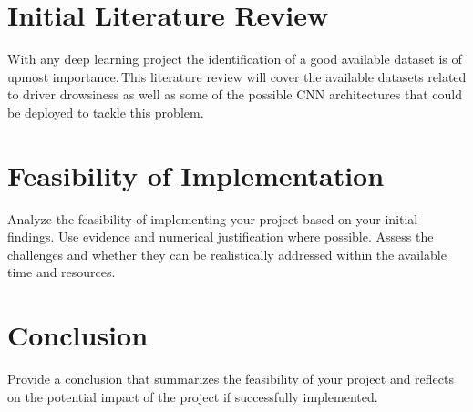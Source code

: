 \documentclass[a4paper, 11pt, twocolumn]{article}
\begin{document}
\section{Initial Literature Review}
\label{sec:litreview}
With any deep learning project the identification of a good available dataset is of upmost importance.\,This literature review will cover the available datasets related to driver
drowsiness as well as some of the possible CNN architectures that could be deployed to tackle this problem.\,








\section{Feasibility of Implementation}
\label{sec:feasibility}
Analyze the feasibility of implementing your project based on your initial findings. Use evidence and numerical justification where possible. Assess the challenges and whether they can be realistically addressed within the available time and resources.

\section{Conclusion}
\label{sec:conclusion}
Provide a conclusion that summarizes the feasibility of your project and reflects on the potential impact of the project if successfully implemented.

\onecolumn
\end{document}
